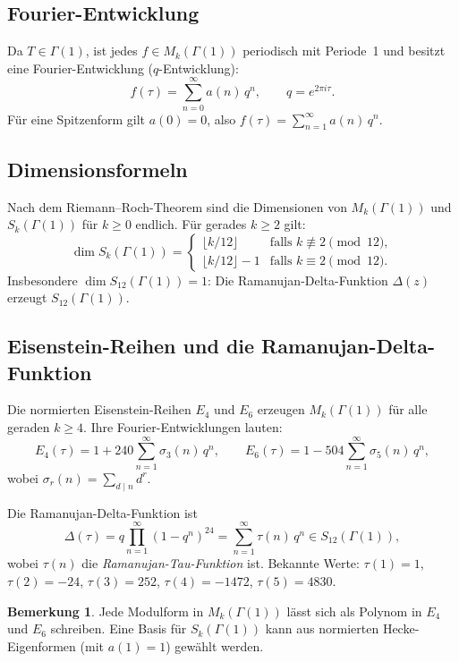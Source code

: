 \documentclass[12pt,a4paper]{amsart}
\theoremstyle{definition}
\newtheorem{bemerkung}[theorem]{Bemerkung}
\begin{document}
\subsection{Fourier-Entwicklung}

Da $T \in \Gamma(1)$, ist jedes $f \in M_k(\Gamma(1))$ periodisch mit Periode~1
und besitzt eine Fourier-Entwicklung ($q$-Entwicklung):
\[
  f(\tau) = \sum_{n=0}^{\infty} a(n)\, q^n, \qquad q = e^{2\pi i\tau}.
\]
F\"ur eine Spitzenform gilt $a(0) = 0$, also $f(\tau) = \sum_{n=1}^{\infty} a(n)\, q^n$.

\subsection{Dimensionsformeln}

Nach dem Riemann--Roch-Theorem sind die Dimensionen von $M_k(\Gamma(1))$ und
$S_k(\Gamma(1))$ f\"ur $k \ge 0$ endlich. F\"ur gerades $k \ge 2$ gilt:
\[
  \dim S_k(\Gamma(1)) = \begin{cases}
    \lfloor k/12 \rfloor & \text{falls } k \not\equiv 2 \pmod{12}, \\
    \lfloor k/12 \rfloor - 1 & \text{falls } k \equiv 2 \pmod{12}.
  \end{cases}
\]
Insbesondere $\dim S_{12}(\Gamma(1)) = 1$: Die Ramanujan-Delta-Funktion $\Delta(z)$
erzeugt $S_{12}(\Gamma(1))$.

\subsection{Eisenstein-Reihen und die Ramanujan-Delta-Funktion}

Die normierten Eisenstein-Reihen $E_4$ und $E_6$ erzeugen $M_k(\Gamma(1))$
f\"ur alle geraden $k \ge 4$. Ihre Fourier-Entwicklungen lauten:
\[
  E_4(\tau) = 1 + 240\sum_{n=1}^{\infty}\sigma_3(n)\,q^n, \qquad
  E_6(\tau) = 1 - 504\sum_{n=1}^{\infty}\sigma_5(n)\,q^n,
\]
wobei $\sigma_r(n) = \sum_{d \mid n} d^r$.

Die Ramanujan-Delta-Funktion ist
\[
  \Delta(\tau) = q\prod_{n=1}^{\infty}(1-q^n)^{24}
               = \sum_{n=1}^{\infty}\tau(n)\,q^n \in S_{12}(\Gamma(1)),
\]
wobei $\tau(n)$ die \emph{Ramanujan-Tau-Funktion} ist. Bekannte Werte:
$\tau(1)=1$, $\tau(2)=-24$, $\tau(3)=252$, $\tau(4)=-1472$, $\tau(5)=4830$.

\begin{bemerkung}
  Jede Modulform in $M_k(\Gamma(1))$ l\"asst sich als Polynom in $E_4$ und
  $E_6$ schreiben. Eine Basis f\"ur $S_k(\Gamma(1))$ kann aus normierten
  Hecke-Eigenformen (mit $a(1)=1$) gew\"ahlt werden.
\end{bemerkung}
\end{document}
